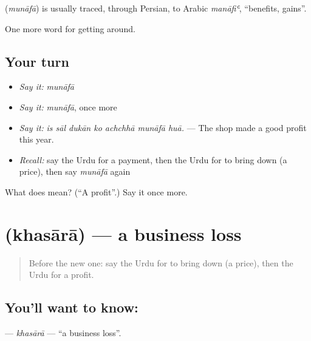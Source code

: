 \begin{cousinweb}
\textbf{} (\emph{munāfā}) is usually traced, through Persian, to Arabic \emph{manāfiʿ}, \textquotedblleft{}benefits, gains\textquotedblright{}.
\end{cousinweb}

\begin{grammarlens}[title={What you've built}]
One more word for getting around.
\end{grammarlens}

\subsection*{Your turn}
\begin{itemize}
\raggedright
  \item \emph{Say it:} \emph{munāfā}
  \item \emph{Say it:} \emph{munāfā}, once more
  \item \emph{Say it:} \emph{is sāl dukān ko achchhā munāfā huā.} — The shop made a good profit this year.
  \item \emph{Recall:} say the Urdu for a payment, then the Urdu for to bring down (a price), then say \emph{munāfā} again
\end{itemize}

\begin{tcolorbox}[breakable,colback=teal!4,colframe=teal!35!black,title={Before you move on}]
What does  mean? (\textquotedblleft{}A profit\textquotedblright{}.) Say it once more.
\end{tcolorbox}
\section[\texorpdfstring{\ur{خسارہ} (khasārā)}{خسارہ (khasārā)}]{ (khasārā) — a business loss}

\label{lesson:UR-C419-khasara}



\begin{quote}
Before the new one: say the Urdu for to bring down (a price), then the Urdu for a profit.
\end{quote}

\subsection*{You'll want to know: }
\textbf{} — \emph{khasārā} — \textquotedblleft{}a business loss\textquotedblright{}.

